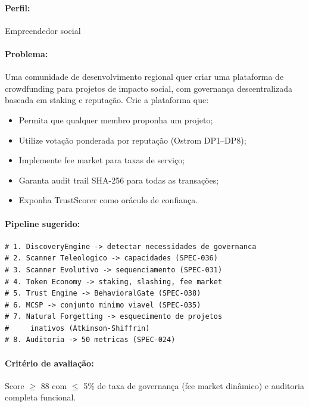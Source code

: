 \begin{exercicio}
\label{ex:crowdfunding}

\paragraph{Perfil:} Empreendedor social \hfill \nivelphd

\paragraph{Problema:} Uma comunidade de desenvolvimento regional
quer criar uma plataforma de crowdfunding para projetos de
impacto social, com governança descentralizada baseada em
staking e reputação. Crie a plataforma que:

\begin{itemize}
    \item Permita que qualquer membro proponha um projeto;
    \item Utilize votação ponderada por reputação (Ostrom DP1--DP8);
    \item Implemente fee market para taxas de serviço;
    \item Garanta audit trail SHA-256 para todas as transações;
    \item Exponha TrustScorer como oráculo de confiança.
\end{itemize}

\paragraph{Pipeline sugerido:}
\begin{lstlisting}[style=bashstyle, basicstyle=\ttfamily\small]
# 1. DiscoveryEngine -> detectar necessidades de governanca
# 2. Scanner Teleologico -> capacidades (SPEC-036)
# 3. Scanner Evolutivo -> sequenciamento (SPEC-031)
# 4. Token Economy -> staking, slashing, fee market
# 5. Trust Engine -> BehavioralGate (SPEC-038)
# 6. MCSP -> conjunto minimo viavel (SPEC-035)
# 7. Natural Forgetting -> esquecimento de projetos
#     inativos (Atkinson-Shiffrin)
# 8. Auditoria -> 50 metricas (SPEC-024)
\end{lstlisting}

\paragraph{Critério de avaliação:} Score $\ge$ 88 com $\le$ 5\%
de taxa de governança (fee market dinâmico) e auditoria
completa funcional.

\end{exercicio}

\endinput
